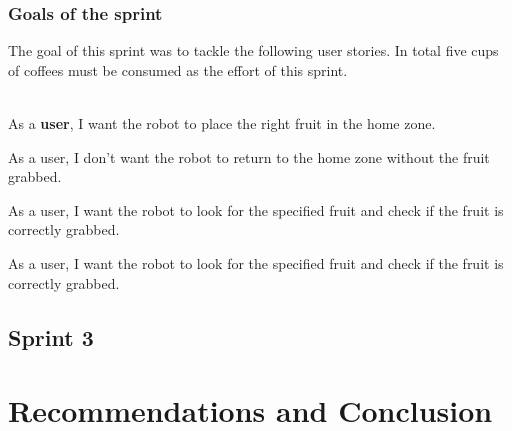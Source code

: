 \subsubsection{Goals of the sprint}\label{sec:sprint2goals}
\noindent The goal of this sprint was to tackle the following user stories. In total five cups of coffees must be consumed as the effort of this sprint.\\
~\\
\begin{minipage}[t]{0.21\textwidth}
	\begin{StickyNote}[Priority 2]
		As a \textbf{user}, I want the robot to place the right fruit in the home zone.
	\end{StickyNote}
\end{minipage}
\begin{minipage}[t]{0.24\textwidth}
	\begin{StickyNote}[Priority 3]
		As a user, I don’t want the robot to return to the home zone without the fruit grabbed.
	\end{StickyNote}
\end{minipage}
\begin{minipage}[t]{0.26\textwidth}
	\begin{StickyNote}[Priority 4]
		As a user, I want the robot to look for the specified fruit and check if the fruit is correctly grabbed.
	\end{StickyNote}
\end{minipage}
\begin{minipage}[t]{0.26\textwidth}
	\begin{StickyNote}[Priority 4]
		As a user, I want the robot to look for the specified fruit and check if the fruit is correctly grabbed.
	\end{StickyNote}
\end{minipage}

\subsection{Sprint 3} \label{sec:sprint3}

\section{Recommendations and Conclusion} \label{sec:RecommendationsAndConclusion}


